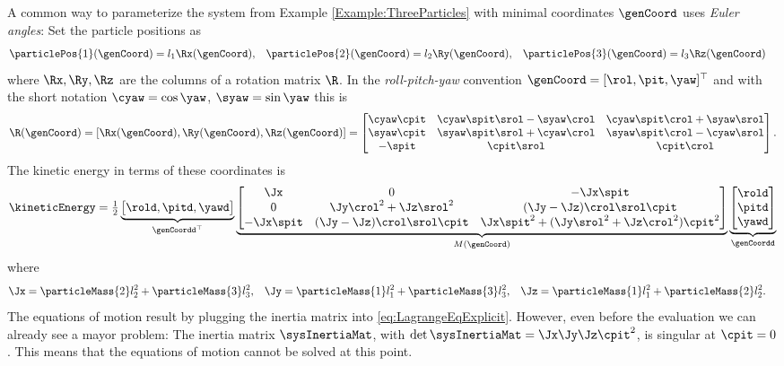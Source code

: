 \begin{Example}\label{Example:EulerAngles}
A common way to parameterize the system from Example \ref{Example:ThreeParticles} with minimal coordinates $\genCoord$ uses \textit{Euler angles}:
Set the particle positions as
\begin{align}
 \particlePos{1}(\genCoord) &= l_1 \Rx(\genCoord),&
 \particlePos{2}(\genCoord) &= l_2 \Ry(\genCoord),&
 \particlePos{3}(\genCoord) &= l_3 \Rz(\genCoord)
\end{align}
where $\Rx, \Ry, \Rz$ are the columns of a rotation matrix $\R$.
In the \textit{roll-pitch-yaw} convention $\genCoord = [\rol, \pit, \yaw]^\top$ and with the short notation $\cyaw = \cos\yaw$, $\syaw = \sin\yaw$ this is
\begin{align}
 \R(\genCoord) = [\Rx(\genCoord), \Ry(\genCoord), \Rz(\genCoord)] =
 \begin{bmatrix}
  \cyaw \cpit & \cyaw \spit \srol - \syaw \crol & \cyaw \spit \crol + \syaw \srol \\
  \syaw \cpit & \syaw \spit \srol + \cyaw \crol & \syaw \spit \crol - \cyaw \srol \\
  -\spit & \cpit \srol & \cpit \crol
 \end{bmatrix}.
\end{align}
The kinetic energy in terms of these coordinates is
\begin{align}
 \kineticEnergy %
 = \tfrac{1}{2} \underbrace{\big[ \rold, \pitd, \yawd \big]}_{\genCoordd^\top}
  \underbrace{\begin{bmatrix}
  \Jx & 0 & -\Jx \spit \\
  0 & \Jy\crol^2 + \Jz\srol^2 & (\Jy-\Jz)\crol\srol\cpit \\
  -\Jx \spit & (\Jy-\Jz)\crol\srol\cpit & \Jx\spit^2 + (\Jy\srol^2 + \Jz\crol^2)\cpit^2 
 \end{bmatrix}}_{M(\genCoord)}
 \underbrace{\begin{bmatrix} \rold \\ \pitd \\ \yawd \end{bmatrix}}_{\genCoordd}
\end{align}
where
\begin{align}
 \Jx &= \particleMass{2}l_2^2 + \particleMass{3}l_3^2,&
 \Jy &= \particleMass{1}l_1^2 + \particleMass{3}l_3^2,&
 \Jz &= \particleMass{1}l_1^2 + \particleMass{2}l_2^2.
\end{align}
The equations of motion result by plugging the inertia matrix into \eqref{eq:LagrangeEqExplicit}.
However, even before the evaluation we can already see a mayor problem:
The inertia matrix $\sysInertiaMat$, with $\det\sysInertiaMat = \Jx\Jy\Jz\cpit^2$, is singular at $\cpit = 0$.
This means that the equations of motion cannot be solved at this point.
\end{Example}

